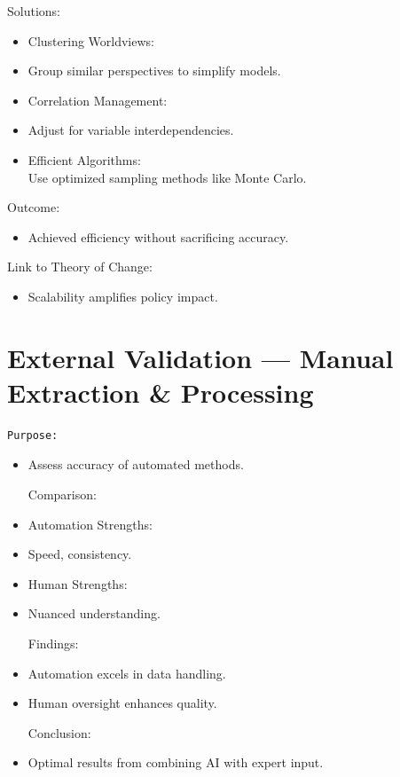 \documentclass[
  letterpaper,
]{book}
\providecommand{\tightlist}{%
  \setlength{\itemsep}{0pt}\setlength{\parskip}{0pt}}
\begin{document}
Solutions:

\begin{itemize}
\tightlist
\item
  Clustering Worldviews:\\
\item
  Group similar perspectives to simplify models.\\
\item
  Correlation Management:\\
\item
  Adjust for variable interdependencies.\\
\item
  Efficient Algorithms:\\
  Use optimized sampling methods like Monte Carlo.
\end{itemize}

Outcome:

\begin{itemize}
\tightlist
\item
  Achieved efficiency without sacrificing accuracy.
\end{itemize}

Link to Theory of Change:

\begin{itemize}
\tightlist
\item
  Scalability amplifies policy impact.
\end{itemize}

\section{External Validation --- Manual Extraction \&
Processing}\label{external-validation-manual-extraction-processing}

\begin{verbatim}
Purpose:
\end{verbatim}

\begin{itemize}
\item
  Assess accuracy of automated methods.

  Comparison:
\item
  Automation Strengths:\\
\item
  Speed, consistency.\\
\item
  Human Strengths:\\
\item
  Nuanced understanding.

  Findings:
\item
  Automation excels in data handling.\\
\item
  Human oversight enhances quality.

  Conclusion:
\item
  Optimal results from combining AI with expert input.
\end{itemize}
\end{document}
